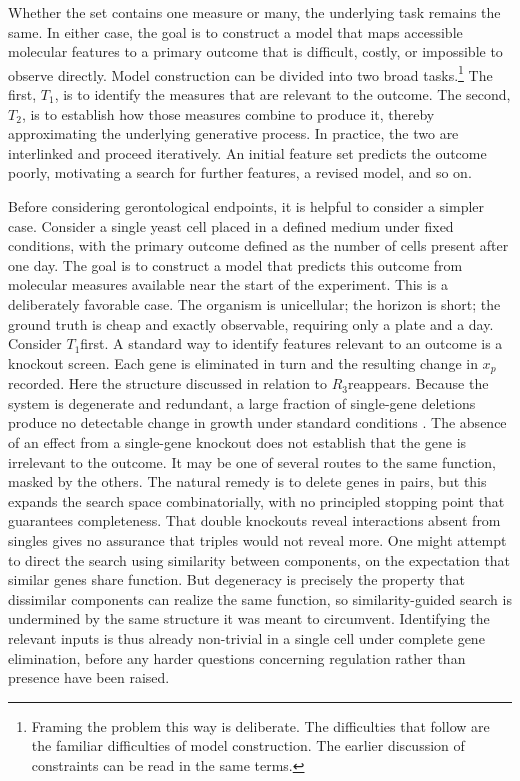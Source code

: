 \documentclass[twocolumn]{article} %
\begin{document}
Whether the set contains one measure or many, the underlying task remains the same. In either case, the goal is to construct a model that maps accessible molecular features to a primary outcome that is difficult, costly, or impossible to observe directly. Model construction can be divided into two broad tasks.\footnote{Framing the problem this way is deliberate. The difficulties that follow are the familiar difficulties of model construction. The earlier discussion of constraints can be read in the same terms.} The first, $T_1$, is to identify the measures that are relevant to the outcome. The second, $T_2$​, is to establish how those measures combine to produce it, thereby approximating the underlying generative process. In practice, the two are interlinked and proceed iteratively. An initial feature set predicts the outcome poorly, motivating a search for further features, a revised model, and so on.

Before considering gerontological endpoints, it is helpful to consider a simpler case. Consider a single yeast cell placed in a defined medium under fixed conditions, with the primary outcome defined as the number of cells present after one day. The goal is to construct a model that predicts this outcome from molecular measures available near the start of the experiment. This is a deliberately favorable case. The organism is unicellular; the horizon is short; the ground truth is cheap and exactly observable, requiring only a plate and a day. Consider $T_1$​ first. A standard way to identify features relevant to an outcome is a knockout screen. Each gene is eliminated in turn and the resulting change in $x_p$ recorded. Here the structure discussed in relation to $R_3$​ reappears. Because the system is degenerate and redundant, a large fraction of single-gene deletions produce no detectable change in growth under standard conditions \cite{edelman2001degeneracy}. The absence of an effect from a single-gene knockout does not establish that the gene is irrelevant to the outcome. It may be one of several routes to the same function, masked by the others. The natural remedy is to delete genes in pairs, but this expands the search space combinatorially, with no principled stopping point that guarantees completeness. That double knockouts reveal interactions absent from singles gives no assurance that triples would not reveal more. One might attempt to direct the search using similarity between components, on the expectation that similar genes share function. But degeneracy is precisely the property that dissimilar components can realize the same function, so similarity-guided search is undermined by the same structure it was meant to circumvent. Identifying the relevant inputs is thus already non-trivial in a single cell under complete gene elimination, before any harder questions concerning regulation rather than presence have been raised.
\end{document}
